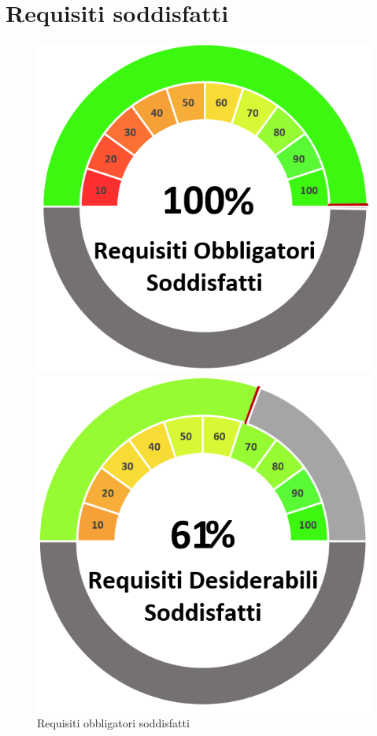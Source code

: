\section{Requisiti soddisfatti}
\begin{figure}[H]
    \centering
    \begin{minipage}[b]{0.32\textwidth}
        \centering
        \includegraphics[width=\textwidth]{ReqObbSodd.png}
        \caption{Requisiti obbligatori soddisfatti}
        \label{reqobbsodd}
    \end{minipage}
    \hfill
    \begin{minipage}[b]{0.32\textwidth}
        \centering
        \includegraphics[width=\textwidth]{ReqDesSodd.png}

\end{minipage}
\end{figure}
